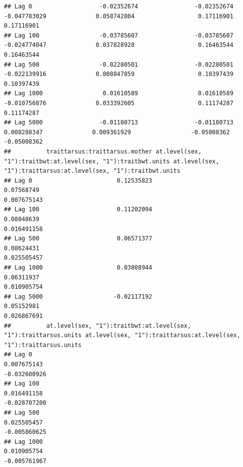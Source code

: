 \documentclass[
  12pt,
]{book}
\begin{document}
\begin{verbatim}
## Lag 0                   -0.02352674                -0.02352674                  -0.047783029              0.058742804                  0.17116901                  0.17116901
## Lag 100                 -0.03785607                -0.03785607                  -0.024774047              0.037828928                  0.16463544                  0.16463544
## Lag 500                 -0.02280501                -0.02280501                  -0.022139916              0.008847859                  0.10397439                  0.10397439
## Lag 1000                 0.01610589                 0.01610589                  -0.010756876              0.033392605                  0.11174287                  0.11174287
## Lag 5000                -0.01180713                -0.01180713                   0.008288347              0.009361929                 -0.05008362                 -0.05008362
##          traittarsus:traittarsus.mother at.level(sex, "1"):traitbwt:at.level(sex, "1"):traitbwt.units at.level(sex, "1"):traittarsus:at.level(sex, "1"):traitbwt.units
## Lag 0                        0.12535823                                                    0.07568749                                                      0.007675143
## Lag 100                      0.11202094                                                    0.08048639                                                      0.016491158
## Lag 500                      0.06571377                                                    0.08624431                                                      0.025505457
## Lag 1000                     0.03808944                                                    0.06311937                                                      0.010905754
## Lag 5000                    -0.02117192                                                    0.05152981                                                      0.026867691
##          at.level(sex, "1"):traitbwt:at.level(sex, "1"):traittarsus.units at.level(sex, "1"):traittarsus:at.level(sex, "1"):traittarsus.units
## Lag 0                                                         0.007675143                                                        -0.032600926
## Lag 100                                                       0.016491158                                                        -0.028707200
## Lag 500                                                       0.025505457                                                        -0.005860625
## Lag 1000                                                      0.010905754                                                        -0.005761967

\end{verbatim}
\end{document}
